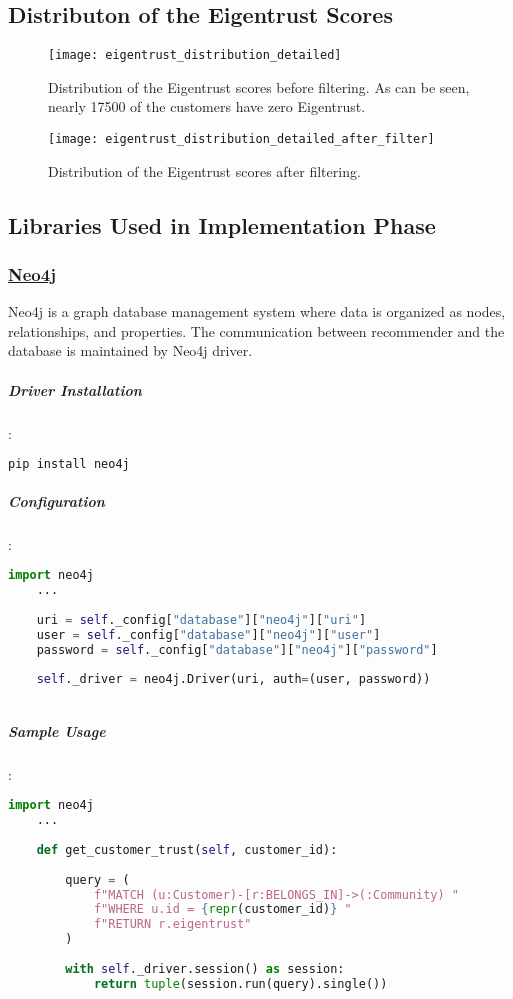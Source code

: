 \subsection{Distributon of the Eigentrust Scores}
	\label{eigentrust_distribution_section}
	\begin{figure}[H]
	\centering
	\texttt{[image: eigentrust\_distribution\_detailed]}
	\caption{Distribution of the Eigentrust scores before filtering. As can be seen, nearly 17500 of the customers have zero Eigentrust.}
	\label{fig:eigentrust_distribution_figure}
	\end{figure}
	\begin{figure}[H]
	\centering
	\texttt{[image: eigentrust\_distribution\_detailed\_after\_filter]}
	\caption{Distribution of the Eigentrust scores after filtering.}
	\label{fig:eigentrust_distribution_figure_after_filtering}
\end{figure}
\subsection{Libraries Used in Implementation Phase}
	\subsubsection{\href{https://neo4j.com/}{Neo4j}}
	Neo4j is a graph database management system where data is organized as nodes, relationships, and properties. The communication between recommender and the database is maintained by Neo4j driver.
	\subparagraph{Driver Installation}:
	\begin{lstlisting}[language=bash]
	pip install neo4j
	\end{lstlisting}
	
	\subparagraph{Configuration}:
	\begin{lstlisting}[language=python]
	import neo4j
	...
	
	uri = self._config["database"]["neo4j"]["uri"]
	user = self._config["database"]["neo4j"]["user"]
	password = self._config["database"]["neo4j"]["password"]
	
	self._driver = neo4j.Driver(uri, auth=(user, password))
	
	\end{lstlisting}
	
	\subparagraph{Sample Usage}:
	\begin{lstlisting}[language=python, caption=Neo4j driver example]
	import neo4j
	...
	
	def get_customer_trust(self, customer_id):
	
		query = (
			f"MATCH (u:Customer)-[r:BELONGS_IN]->(:Community) "
			f"WHERE u.id = {repr(customer_id)} "
			f"RETURN r.eigentrust"
		)
	
		with self._driver.session() as session:
			return tuple(session.run(query).single())
	
	\end{lstlisting}
	
